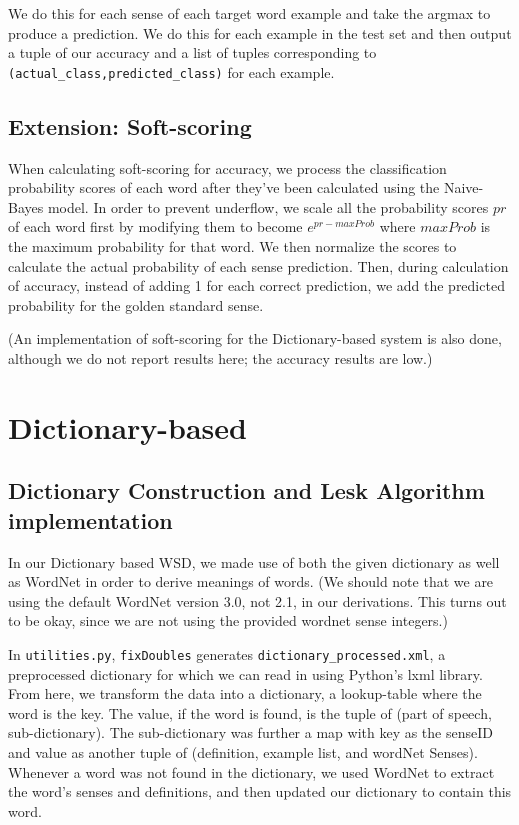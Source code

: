 \documentclass{article}
\begin{document}
We do this for each sense of each target word example and take the argmax to produce a prediction. We do this for each example in the test set and then output a tuple of our accuracy and a list of tuples corresponding to \texttt{(actual\_class,predicted\_class)} for each example. 

\subsection{Extension: Soft-scoring}
When calculating soft-scoring for accuracy, we process the classification probability scores of each word after they've been calculated using the Naive-Bayes model. In order to prevent underflow, we scale all the probability scores $pr$ of each word first by modifying them to become $e^{pr-maxProb}$ where $maxProb$ is the maximum probability for that word. We then normalize the scores to calculate the actual probability of each sense prediction. Then, during calculation of accuracy, instead of adding 1 for each correct prediction, we add the predicted probability for the golden standard sense.

(An implementation of soft-scoring for the Dictionary-based system is also done, although we do not report results here; the accuracy results are low.)

\section{Dictionary-based}

\subsection{Dictionary Construction and Lesk Algorithm implementation}
In our Dictionary based WSD, we made use of both the given dictionary as well as WordNet in order to derive meanings of words. (We should note that we are using the default WordNet version 3.0, not 2.1, in our derivations. This turns out to be okay, since we are not using the provided wordnet sense integers.)

In \texttt{utilities.py}, \texttt{fixDoubles} generates \texttt{dictionary\_processed.xml}, a preprocessed dictionary for which we can read in using Python's lxml library. From here, we transform the data into a dictionary, a lookup-table where the word is the key. The value, if the word is found, is the tuple of (part of speech, sub-dictionary). The sub-dictionary was further a map with key as the senseID and value as another tuple of (definition, example list, and wordNet Senses). Whenever a word was not found in the dictionary, we used WordNet to extract the word's senses and definitions, and then updated our dictionary to contain this word.
\end{document}
